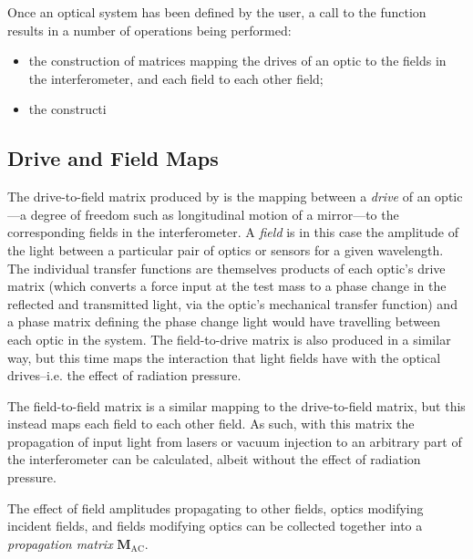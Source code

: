 Once an optical system has been defined by the user, a call to the  function results in a number of operations being performed:
\begin{itemize}
  \item the construction of matrices mapping the drives of an optic to the fields in the interferometer, and each field to each other field;
  \item the constructi
\end{itemize}

\subsection{Drive and Field Maps}
The drive-to-field matrix produced by  is the mapping between a \emph{drive} of an optic---a degree of freedom such as longitudinal motion of a mirror---to the corresponding fields in the interferometer. A \emph{field} is in this case the amplitude of the light between a particular pair of optics or sensors for a given wavelength. The individual transfer functions are themselves products of each optic's drive matrix (which converts a force input at the test mass to a phase change in the reflected and transmitted light, via the optic's mechanical transfer function) and a phase matrix defining the phase change light would have travelling between each optic in the system. The field-to-drive matrix is also produced in a similar way, but this time maps the interaction that light fields have with the optical drives--i.e. the effect of radiation pressure.

The field-to-field matrix is a similar mapping to the drive-to-field matrix, but this instead maps each field to each other field. As such, with this matrix the propagation of input light from lasers or vacuum injection to an arbitrary part of the interferometer can be calculated, albeit without the effect of radiation pressure.

The effect of field amplitudes propagating to other fields, optics modifying incident fields, and fields modifying optics can be collected together into a \emph{propagation matrix} $\mathbf{M}_{\text{AC}}$.

